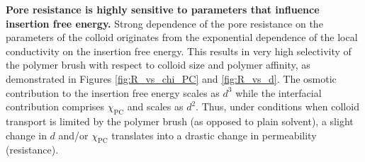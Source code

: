 \documentclass[12pt, a4paper]{article}
\begin{document}
\textbf{Pore resistance is highly sensitive to parameters that influence insertion free energy.}
Strong dependence of the pore resistance on the parameters of the colloid originates from the exponential dependence of the local conductivity on the insertion free energy.
This results in very high selectivity of the polymer brush with respect to colloid size and polymer affinity, as demonstrated in Figures \ref{fig:R_vs_chi_PC} and \ref{fig:R_vs_d}.
The osmotic contribution to the insertion free energy scales as $d^3$ while the interfacial contribution comprises $\chi_{\text{PC}}$ and scales as $d^2$.
Thus, under conditions when colloid transport is limited by the polymer brush (as opposed to plain solvent), a slight change in $d$ and/or $\chi_{\text{PC}}$ translates into a drastic change in permeability (resistance).




\end{document}
